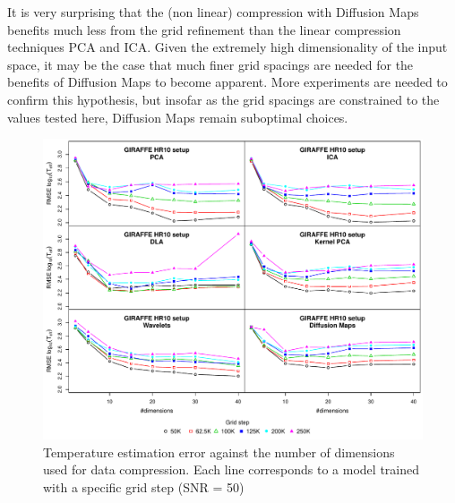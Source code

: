 \documentclass[a4paper,fleqn,usenatbib]{mnras}
\begin{document}
{{{{It is very surprising that the (non linear) compression with Diffusion Maps benefits much less from the grid refinement than the linear compression techniques PCA and ICA. Given the extremely high dimensionality of the input space, it may be the case that much finer grid spacings are needed for the benefits of Diffusion Maps to become apparent. More experiments are needed to confirm this hypothesis, but insofar as the grid spacings are constrained to the values tested here, Diffusion Maps remain suboptimal choices.

	} 

\begin{figure}
\centering\includegraphics[width=\textwidth]{bestSVM_Teff_N-RMSE_HR10_snr=50_all.pdf}
\caption{Temperature estimation error against the number of dimensions
  used for data compression. Each line corresponds to a model trained
  with a specific grid step (SNR = 50)}
\label{fig:grid50}
\end{figure}

}}}
\end{document}
